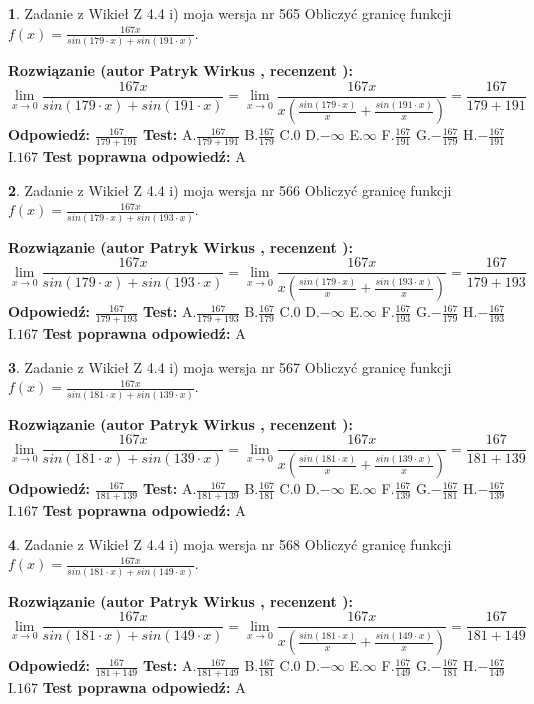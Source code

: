 \documentclass[12pt, a4paper]{article}
\theoremstyle{definition} %
\newtheorem{zad}{}
\newcommand{\zadStart}[1]{\begin{zad}#1\newline}
\newcommand{\zadStop}{\end{zad}}
\newcommand{\rozwStart}[2]{\noindent \textbf{Rozwiązanie (autor #1 , recenzent #2): }\newline}
\newcommand{\rozwStop}{\newline}
\newcommand{\odpStart}{\noindent \textbf{Odpowiedź:}\newline}
\newcommand{\odpStop}{\newline}
\newcommand{\testStart}{\noindent \textbf{Test:}\newline}
\newcommand{\testStop}{\newline}
\newcommand{\kluczStart}{\noindent \textbf{Test poprawna odpowiedź:}\newline}
\newcommand{\kluczStop}{\newline}
\begin{document}
\zadStart{Zadanie z Wikieł Z 4.4 i) moja wersja nr 565}
Obliczyć granicę funkcji $f(x)=\frac{167x}{sin(179\cdot x) +sin(191\cdot x)}$.
\zadStop
\rozwStart{Patryk Wirkus}{}
$$\lim\limits_{x\to 0}\frac{167x}{sin(179\cdot x) +sin(191\cdot x)}=\lim\limits_{x\to 0}\frac{167x}{x(\frac{sin(179\cdot x)}{x}+\frac{sin(191\cdot x)}{x})}=\frac{167}{179+191}$$
\rozwStop
\odpStart
$\frac{167}{179+191}$
\odpStop
\testStart
A.$\frac{167}{179+191}$
B.$\frac{167}{179}$
C.$0$
D.$-\infty$
E.$\infty$
F.$\frac{167}{191}$
G.$-\frac{167}{179}$
H.$-\frac{167}{191}$
I.$167$
\testStop
\kluczStart
A
\kluczStop



\zadStart{Zadanie z Wikieł Z 4.4 i) moja wersja nr 566}
Obliczyć granicę funkcji $f(x)=\frac{167x}{sin(179\cdot x) +sin(193\cdot x)}$.
\zadStop
\rozwStart{Patryk Wirkus}{}
$$\lim\limits_{x\to 0}\frac{167x}{sin(179\cdot x) +sin(193\cdot x)}=\lim\limits_{x\to 0}\frac{167x}{x(\frac{sin(179\cdot x)}{x}+\frac{sin(193\cdot x)}{x})}=\frac{167}{179+193}$$
\rozwStop
\odpStart
$\frac{167}{179+193}$
\odpStop
\testStart
A.$\frac{167}{179+193}$
B.$\frac{167}{179}$
C.$0$
D.$-\infty$
E.$\infty$
F.$\frac{167}{193}$
G.$-\frac{167}{179}$
H.$-\frac{167}{193}$
I.$167$
\testStop
\kluczStart
A
\kluczStop



\zadStart{Zadanie z Wikieł Z 4.4 i) moja wersja nr 567}
Obliczyć granicę funkcji $f(x)=\frac{167x}{sin(181\cdot x) +sin(139\cdot x)}$.
\zadStop
\rozwStart{Patryk Wirkus}{}
$$\lim\limits_{x\to 0}\frac{167x}{sin(181\cdot x) +sin(139\cdot x)}=\lim\limits_{x\to 0}\frac{167x}{x(\frac{sin(181\cdot x)}{x}+\frac{sin(139\cdot x)}{x})}=\frac{167}{181+139}$$
\rozwStop
\odpStart
$\frac{167}{181+139}$
\odpStop
\testStart
A.$\frac{167}{181+139}$
B.$\frac{167}{181}$
C.$0$
D.$-\infty$
E.$\infty$
F.$\frac{167}{139}$
G.$-\frac{167}{181}$
H.$-\frac{167}{139}$
I.$167$
\testStop
\kluczStart
A
\kluczStop



\zadStart{Zadanie z Wikieł Z 4.4 i) moja wersja nr 568}
Obliczyć granicę funkcji $f(x)=\frac{167x}{sin(181\cdot x) +sin(149\cdot x)}$.
\zadStop
\rozwStart{Patryk Wirkus}{}
$$\lim\limits_{x\to 0}\frac{167x}{sin(181\cdot x) +sin(149\cdot x)}=\lim\limits_{x\to 0}\frac{167x}{x(\frac{sin(181\cdot x)}{x}+\frac{sin(149\cdot x)}{x})}=\frac{167}{181+149}$$
\rozwStop
\odpStart
$\frac{167}{181+149}$
\odpStop
\testStart
A.$\frac{167}{181+149}$
B.$\frac{167}{181}$
C.$0$
D.$-\infty$
E.$\infty$
F.$\frac{167}{149}$
G.$-\frac{167}{181}$
H.$-\frac{167}{149}$
I.$167$
\testStop
\kluczStart
A
\kluczStop
\end{document}

